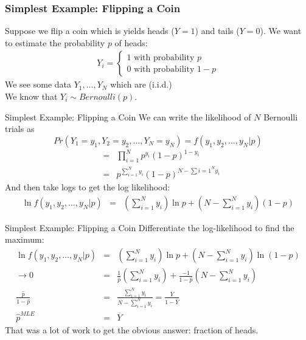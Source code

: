 \documentclass[aspectratio=169]{beamer}
\begin{document}
\begin{frame}
\frametitle{Simplest Example: Flipping a Coin}
Suppose we flip a coin which is yields heads ($Y=1$) and tails ($Y=0$). We want to estimate the probability $p$ of heads:
\begin{eqnarray*}
Y_i =
\begin{cases}
1 \mbox{ with probability } p \\
0 \mbox{ with probability } 1-p
\end{cases}
\end{eqnarray*}
We see some data $Y_1,\ldots,Y_N$ which are (i.i.d.)\\
\vspace{0.2cm}
We know that $Y_i \sim Bernoulli(p)$.
\end{frame}


\begin{frame}{Simplest Example: Flipping a Coin}
We can write the likelihood of $N$ Bernoulli trials as 
$$Pr(Y_1 = y_1, Y_2=y_2,\ldots,Y _N=y_N )  =  f(y_1,y_2,\ldots,y_N | p ) $$
\begin{eqnarray*}
&=& \prod_{i=1}^N p^{y_i} (1-p)^{1-y_i}\\
&=& p^{\sum_{i=1}^N y_i} (1-p)^{N-\sum{i=1}^N y_i}
\end{eqnarray*}
And then take logs to get the \alert{log likelihood}:
\begin{eqnarray*}
\ln  f(y_1,y_2,\ldots,y_N | p )  &=& \left( \sum_{i=1}^N y_i \right)  \ln p  + \left(N-\sum_{i=1}^N y_i \right)  (1-p)
\end{eqnarray*}
\end{frame}

\begin{frame}{Simplest Example: Flipping a Coin}
Differentiate the log-likelihood to find the maximum:
\begin{eqnarray*}
\ln  f(y_1,y_2,\ldots,y_N | p )  &=& \left( \sum_{i=1}^N y_i \right)  \ln p  + \left(N-\sum_{i=1}^N y_i \right)  \ln(1-p)\\
\rightarrow 0&=& \frac{1}{\hat{p}}  \left( \sum_{i=1}^N y_i \right) + \frac{-1}{1-\hat{p}}   \left(N-\sum_{i=1}^N y_i \right) \\
 \frac{\hat{p}}{1-\hat{p}} &=& \frac{\sum_{i=1}^N y_i }{N- \sum_{i=1}^N y_i } = \frac{\overline{Y}}{1-\overline{Y}} \\
\hat{p}^{MLE} &=& \overline{Y}
\end{eqnarray*}
That was a lot of work to get the obvious answer: \alert{fraction of heads}.
\end{frame}
\end{document}
